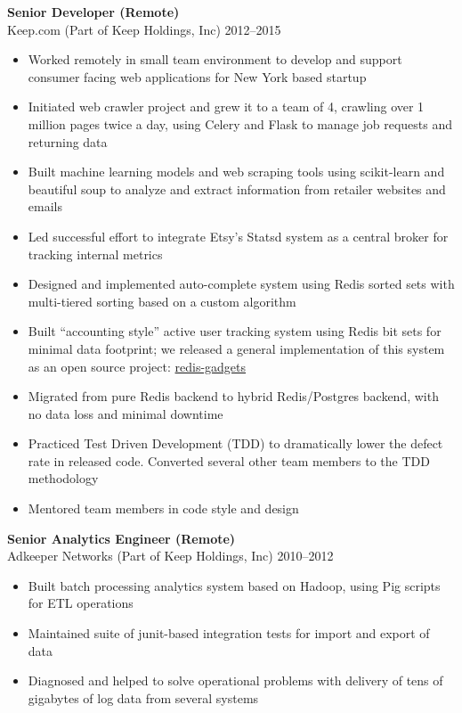\documentclass[margin]{res}
\begin{document}
\begin{resume}
{\bf Senior Developer (Remote)}\\
    Keep.com (Part of Keep Holdings, Inc) \hfill 2012--2015
\begin{itemize}
  \item Worked remotely in small team environment to develop and support
      consumer facing web applications for New York based startup
  \item Initiated web crawler project and grew it to a team of 4, crawling
    over 1 million pages twice a day, using Celery and Flask to manage job
    requests and returning data
  \item Built machine learning models and web scraping tools using
    scikit-learn and beautiful soup to analyze and extract information from
    retailer websites and emails
  \item Led successful effort to integrate Etsy's Statsd system as a central
    broker for tracking internal metrics
  \item Designed and implemented auto-complete system using Redis sorted sets
    with multi-tiered sorting based on a custom algorithm
  \item Built ``accounting style'' active user tracking system using Redis bit
    sets for minimal data footprint; we released a general implementation of
    this system as an open source project:
    \href{https://github.com/saltmine/redis-gadgets}{redis-gadgets}
  \item Migrated from pure Redis backend to hybrid Redis/Postgres backend,
      with no data loss and minimal downtime
  \item Practiced Test Driven Development (TDD) to dramatically lower the
      defect rate in released code.  Converted several other team members to
      the TDD methodology
  \item Mentored team members in code style and design
\end{itemize}

{\bf Senior Analytics Engineer (Remote)}\\
Adkeeper Networks (Part of Keep Holdings, Inc) \hfill  2010--2012
\begin{itemize}
  \item Built batch processing analytics system based on Hadoop, using Pig
      scripts for ETL operations
  \item Maintained suite of junit-based integration tests for import and
      export of data
  \item Diagnosed and helped to solve operational problems with delivery of
      tens of gigabytes of log data from several systems
\end{itemize}


\end{resume}
\end{document}
